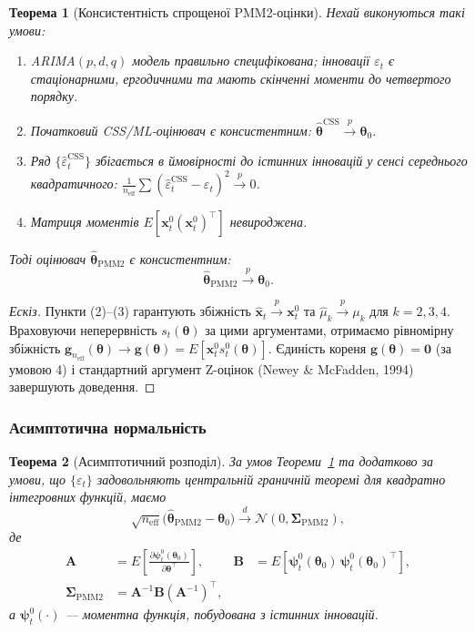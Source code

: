 \documentclass[12pt,a4paper]{article}
\newtheorem{theorem}{Теорема}[section]
\begin{document}
\begin{theorem}[Консистентність спрощеної PMM2-оцінки]
\label{thm:pmm2_consistency}
Нехай виконуються такі умови:
\begin{enumerate}
    \item ARIMA$(p,d,q)$ модель правильно специфікована; інновації $\varepsilon_t$ є стаціонарними, ергодичними та мають скінченні моменти до четвертого порядку.
    \item Початковий CSS/ML-оцінювач є консистентним: $\hat{\boldsymbol{\theta}}^{\text{CSS}} \xrightarrow{p} \boldsymbol{\theta}_0$.
    \item Ряд $\{\widehat{\varepsilon}_t^{\text{CSS}}\}$ збігається в ймовірності до істинних інновацій у сенсі середнього квадратичного: $\frac{1}{n_\text{eff}}\sum (\widehat{\varepsilon}_t^{\text{CSS}} - \varepsilon_t)^2 \xrightarrow{p} 0$.
    \item Матриця моментів $E[\mathbf{x}_t^0 (\mathbf{x}_t^0)^\top]$ невироджена.
\end{enumerate}
Тоді оцінювач $\hat{\boldsymbol{\theta}}_{\text{PMM2}}$ є консистентним:
\[
\hat{\boldsymbol{\theta}}_{\text{PMM2}} \xrightarrow{p} \boldsymbol{\theta}_0.
\]
\end{theorem}

\begin{proof}[Ескіз]
Пункти (2)--(3) гарантують збіжність $\widehat{\mathbf{x}}_t \xrightarrow{p} \mathbf{x}_t^0$ та $\hat{\mu}_k \xrightarrow{p} \mu_k$ для $k=2,3,4$. Враховуючи неперервність $s_t(\boldsymbol{\theta})$ за цими аргументами, отримаємо рівномірну збіжність $\mathbf{g}_{n_\text{eff}}(\boldsymbol{\theta}) \to \mathbf{g}(\boldsymbol{\theta}) = E[\mathbf{x}_t^0 s_t^0(\boldsymbol{\theta})]$. Єдиність кореня $\mathbf{g}(\boldsymbol{\theta})=\mathbf{0}$ (за умовою 4) і стандартний аргумент Z-оцінок (Newey \& McFadden, 1994) завершують доведення.
\end{proof}

\subsubsection{Асимптотична нормальність}

\begin{theorem}[Асимптотичний розподіл]
\label{thm:asymptotic_normality}
За умов Теореми~\ref{thm:pmm2_consistency} та додатково за умови, що $\{\varepsilon_t\}$ задовольняють центральній граничній теоремі для квадратно інтегровних функцій, маємо
\[
\sqrt{n_\text{eff}}\big(\hat{\boldsymbol{\theta}}_{\text{PMM2}} - \boldsymbol{\theta}_0\big) \xrightarrow{d} \mathcal{N}(0,\boldsymbol{\Sigma}_{\text{PMM2}}),
\]
де
\begin{align}
\mathbf{A} &= E\!\left[ \frac{\partial \boldsymbol{\psi}_t^0(\boldsymbol{\theta}_0)}{\partial \boldsymbol{\theta}^\top} \right],
&
\mathbf{B} &= E\!\left[ \boldsymbol{\psi}_t^0(\boldsymbol{\theta}_0)\, \boldsymbol{\psi}_t^0(\boldsymbol{\theta}_0)^\top \right],\\
\boldsymbol{\Sigma}_{\text{PMM2}} &= \mathbf{A}^{-1}\mathbf{B}(\mathbf{A}^{-1})^\top,
\end{align}
а $\boldsymbol{\psi}_t^0(\cdot)$ --- моментна функція, побудована з істинних інновацій.
\end{theorem}
\end{document}
